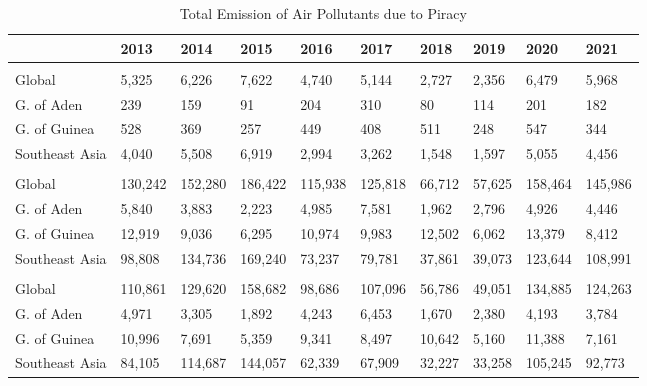 \begin{table}

\caption{\label{tab:tab:counterfactual_emissions}Total Emission of Air Pollutants due to Piracy}
\centering
\begin{adjustbox}{width = .9\textwidth}
\begin{tabular}[t]{llllllllll}
\toprule
 & 2013 & 2014 & 2015 & 2016 & 2017 & 2018 & 2019 & 2020 & 2021\\
\midrule
\addlinespace[0.3em]
\multicolumn{10}{l}{\textbf{CO\_2 (Thousand metric tons)}}\\
\hspace{1em}Global & 5,325 & 6,226 & 7,622 & 4,740 & 5,144 & 2,727 & 2,356 & 6,479 & 5,968\\
\hspace{1em}G. of Aden & 239 & 159 & 91 & 204 & 310 & 80 & 114 & 201 & 182\\
\hspace{1em}G. of Guinea & 528 & 369 & 257 & 449 & 408 & 511 & 248 & 547 & 344\\
\hspace{1em}Southeast Asia & 4,040 & 5,508 & 6,919 & 2,994 & 3,262 & 1,548 & 1,597 & 5,055 & 4,456\\
\addlinespace[0.3em]
\multicolumn{10}{l}{\textbf{NOx (Metric tons)}}\\
\hspace{1em}Global & 130,242 & 152,280 & 186,422 & 115,938 & 125,818 & 66,712 & 57,625 & 158,464 & 145,986\\
\hspace{1em}G. of Aden & 5,840 & 3,883 & 2,223 & 4,985 & 7,581 & 1,962 & 2,796 & 4,926 & 4,446\\
\hspace{1em}G. of Guinea & 12,919 & 9,036 & 6,295 & 10,974 & 9,983 & 12,502 & 6,062 & 13,379 & 8,412\\
\hspace{1em}Southeast Asia & 98,808 & 134,736 & 169,240 & 73,237 & 79,781 & 37,861 & 39,073 & 123,644 & 108,991\\
\addlinespace[0.3em]
\multicolumn{10}{l}{\textbf{SOx (Metric tons)}}\\
\hspace{1em}Global & 110,861 & 129,620 & 158,682 & 98,686 & 107,096 & 56,786 & 49,051 & 134,885 & 124,263\\
\hspace{1em}G. of Aden & 4,971 & 3,305 & 1,892 & 4,243 & 6,453 & 1,670 & 2,380 & 4,193 & 3,784\\
\hspace{1em}G. of Guinea & 10,996 & 7,691 & 5,359 & 9,341 & 8,497 & 10,642 & 5,160 & 11,388 & 7,161\\
\hspace{1em}Southeast Asia & 84,105 & 114,687 & 144,057 & 62,339 & 67,909 & 32,227 & 33,258 & 105,245 & 92,773\\
\bottomrule
\end{tabular}
\end{adjustbox}
\end{table}
